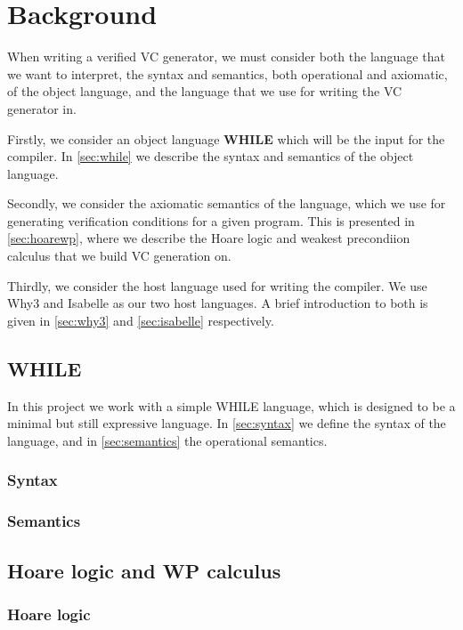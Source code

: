 \section{Background}
When writing a verified VC generator, we must consider both the language that we want to interpret, the syntax and semantics, both operational and axiomatic, of the object language, and the language that we use for writing the VC generator in.

Firstly, we consider an object language \textbf{WHILE} which will be the input for the compiler.
In \autoref{sec:while} we describe the syntax and semantics of the object language.

Secondly, we consider the axiomatic semantics of the language, which we use for generating verification conditions for a given program. This is presented in \autoref{sec:hoarewp}, where we describe the Hoare logic and weakest precondiion calculus that we build VC generation on.

Thirdly, we consider the host language used for writing the compiler.
We use Why3 and Isabelle as our two host languages. A brief introduction to both is given in \autoref{sec:why3} and \autoref{sec:isabelle} respectively.

\subsection{WHILE}\label{sec:while}
In this project we work with a simple WHILE language, which is designed to be a minimal but still expressive language.
In \autoref{sec:syntax} we define the syntax of the language, and in \autoref{sec:semantics} the operational semantics.

\subsubsection{Syntax}\label{sec:syntax}

\subsubsection{Semantics}\label{sec:semantics}


\subsection{Hoare logic and WP calculus}\label{sec:hoarewp}

\subsubsection{Hoare logic}\label{sec:hoare}


